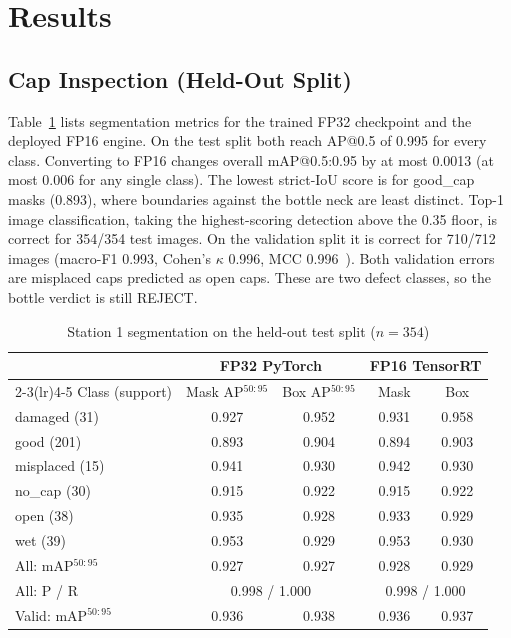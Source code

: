 \documentclass[conference]{IEEEtran}
\begin{document}
\section{Results}
\subsection{Cap Inspection (Held-Out Split)}
\label{sec:capresults}
Table~\ref{tab:capseg} lists segmentation metrics for the trained FP32 checkpoint and the deployed FP16 engine. On the test split both reach AP@0.5 of 0.995 for every class. Converting to FP16 changes overall mAP@0.5:0.95 by at most 0.0013 (at most 0.006 for any single class). The lowest strict-IoU score is for good\_cap masks (0.893), where boundaries against the bottle neck are least distinct. Top-1 image classification, taking the highest-scoring detection above the 0.35 floor, is correct for 354/354 test images. On the validation split it is correct for 710/712 images (macro-F1 0.993, Cohen's $\kappa$ 0.996, MCC 0.996~\cite{chicco2020}). Both validation errors are misplaced caps predicted as open caps. These are two defect classes, so the bottle verdict is still REJECT.

\begin{table}[t]
\caption{Station 1 segmentation on the held-out test split ($n{=}354$)}
\label{tab:capseg}
\centering
\setlength{\tabcolsep}{4pt}
\begin{tabular}{lcccc}
\toprule
& \multicolumn{2}{c}{FP32 PyTorch} & \multicolumn{2}{c}{FP16 TensorRT}\\
\cmidrule(lr){2-3}\cmidrule(lr){4-5}
Class (support) & Mask AP$^{50:95}$ & Box AP$^{50:95}$ & Mask & Box\\
\midrule
damaged (31) & 0.927 & 0.952 & 0.931 & 0.958\\
good (201) & 0.893 & 0.904 & 0.894 & 0.903\\
misplaced (15) & 0.941 & 0.930 & 0.942 & 0.930\\
no\_cap (30) & 0.915 & 0.922 & 0.915 & 0.922\\
open (38) & 0.935 & 0.928 & 0.933 & 0.929\\
wet (39) & 0.953 & 0.929 & 0.953 & 0.930\\
\midrule
All: mAP$^{50:95}$ & 0.927 & 0.927 & 0.928 & 0.929\\
All: P / R & \multicolumn{2}{c}{0.998 / 1.000} & \multicolumn{2}{c}{0.998 / 1.000}\\
Valid: mAP$^{50:95}$ & 0.936 & 0.938 & 0.936 & 0.937\\
\bottomrule
\end{tabular}
\end{table}
\end{document}
